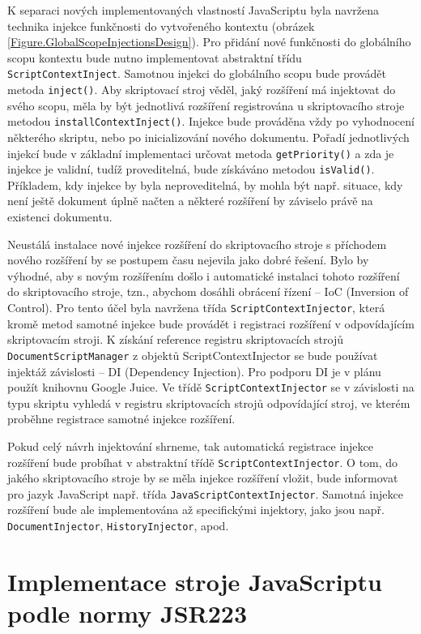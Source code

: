 K separaci nových implementovaných vlastností JavaScriptu byla navržena technika injekce funkčnosti do vytvořeného kontextu (obrázek \ref{Figure.GlobalScopeInjectionsDesign}). Pro přidání nové funkčnosti do globálního scopu kontextu bude nutno implementovat abstraktní třídu \texttt{ScriptContextInject}. Samotnou injekci do globálního scopu bude provádět metoda \texttt{inject()}. Aby skriptovací stroj věděl, jaký rozšíření má injektovat do svého scopu, měla by být jednotlivá rozšíření registrována u skriptovacího stroje metodou \texttt{installContextInject()}. Injekce bude prováděna vždy po vyhodnocení některého skriptu, nebo po inicializování nového dokumentu. Pořadí jednotlivých injekcí bude v základní implementaci určovat metoda \texttt{getPriority()} a zda je injekce je validní, tudíž proveditelná, bude získáváno metodou \texttt{isValid()}. Příkladem, kdy injekce by byla neproveditelná, by mohla být např. situace, kdy není ještě dokument úplně načten a některé rozšíření by záviselo právě na existenci dokumentu.

Neustálá instalace nové injekce rozšíření do skriptovacího stroje s příchodem nového rozšíření by se postupem času nejevila jako dobré řešení. Bylo by výhodné, aby s novým rozšířením došlo i automatické instalaci tohoto rozšíření do skriptovacího stroje, tzn., abychom dosáhli obrácení řízení -- IoC (Inversion of Control). Pro tento účel byla navržena třída \texttt{ScriptContextInjector}, která kromě metod samotné injekce bude provádět i registraci rozšíření v odpovídajícím skriptovacím stroji. K získání reference registru skriptovacích strojů \texttt{DocumentScriptManager} z objektů ScriptContextInjector se bude používat injektáž závislosti -- DI (Dependency Injection). Pro podporu DI je v plánu použít knihovnu Google Juice. Ve třídě \texttt{ScriptContextInjector} se v závislosti na typu skriptu vyhledá v registru skriptovacích strojů odpovídající stroj, ve kterém proběhne registrace samotné injekce rozšíření. 

Pokud celý návrh injektování shrneme, tak automatická registrace injekce rozšíření bude probíhat v abstraktní třídě \texttt{ScriptContextInjector}. O tom, do jakého skriptovacího stroje by se měla injekce rozšíření vložit, bude informovat pro jazyk JavaScript např. třída \texttt{JavaScriptContextInjector}. Samotná injekce rozšíření bude ale implementována až specifickými injektory, jako jsou např. \texttt{DocumentInjector}, \texttt{HistoryInjector}, apod.

\section{Implementace stroje JavaScriptu podle normy JSR223}
\label{Chapter.Design.JavaScriptEngineJSR223}

